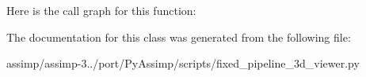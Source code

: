 Here is the call graph for this function\+:




The documentation for this class was generated from the following file\+:\begin{DoxyCompactItemize}
\item 
assimp/assimp-\/3../port/\+Py\+Assimp/scripts/fixed\+\_\+pipeline\+\_\+3d\+\_\+viewer.\+py\end{DoxyCompactItemize}

